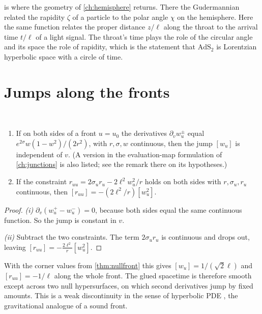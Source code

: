  is where the geometry of \cref{ch:hemisphere} returns. There the Gudermannian related the rapidity $\zeta$ of a particle to the polar angle $\chi$ on the hemisphere. Here the same function relates the proper distance $z/\ell$ along the throat to the arrival time $t/\ell$ of a light signal. The throat's time plays the role of the circular angle and its space the role of rapidity, which is the statement that $\mathrm{AdS}_2$ is Lorentzian hyperbolic space with a circle of time.

\section{Jumps along the fronts}

\begin{proposition}\label{prop:jumps}\ver\
\begin{enumerate}[label=(\roman*)]
\item If on both sides of a front $u=u_0$ the derivatives $\partial_v w_u^\pm$ equal $e^{2\sigma}w(1-w^2)/(2r^2)$, with $r,\sigma,w$ continuous, then the jump $[w_u]$ is independent of $v$. (A version in the evaluation-map formulation of \cref{ch:junctions} is also listed; see the remark there on its hypotheses.)
\item If the constraint $r_{uu}=2\sigma_ur_u-2\ell^2w_u^2/r$ holds on both sides with $r,\sigma_u,r_u$ continuous, then $[r_{uu}]=-(2\ell^2/r)[w_u^2]$.
\end{enumerate}
\end{proposition}
\begin{proof}
\emph{(i)} $\partial_v(w_u^+-w_u^-)=0$, because both sides equal the same continuous function. So the jump is constant in $v$.

\emph{(ii)} Subtract the two constraints. The term $2\sigma_ur_u$ is continuous and drops out, leaving $[r_{uu}]=-\frac{2\ell^2}r[w_u^2]$.
\end{proof}


With the corner values from \cref{thm:nullfront} this gives $[w_u]=1/(\sqrt2\ell)$ and $[r_{uu}]=-1/\ell$ along the whole front. The glued spacetime is therefore smooth except across two null hypersurfaces, on which second derivatives jump by fixed amounts. This is a weak discontinuity in the sense of hyperbolic PDE \cite{CourantHilbert2}, the gravitational analogue of a sound front.

